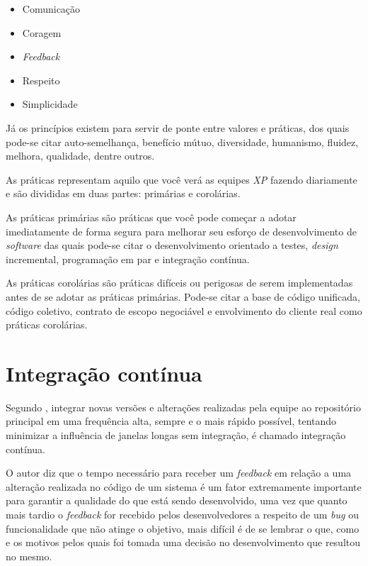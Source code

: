 \documentclass[
12pt,				%
openright,			%
oneside,			%
a4paper,			%
english,			%
french,				%
spanish,			%
brazil,				%
]{abntex2}
\begin{document}
\begin{itemize}
	\item Comunicação
	\item Coragem
	\item \textit{Feedback}
	\item Respeito
	\item Simplicidade
\end{itemize}

Já os princípios existem para servir de ponte entre valores e práticas, dos quais pode-se citar auto-semelhança, benefício mútuo, diversidade, humanismo, fluidez, melhora, qualidade, dentre outros.

As práticas representam aquilo que você verá as equipes \textit{XP} fazendo diariamente e são divididas em duas partes: primárias e corolárias. 

As práticas primárias são práticas que você pode começar a adotar imediatamente de forma segura para melhorar seu esforço de desenvolvimento de \textit{software} das quais pode-se citar o desenvolvimento orientado a testes, \textit{design} incremental, programação em par e integração contínua.

As práticas corolárias são práticas difíceis ou perigosas de serem implementadas antes de se adotar as práticas primárias. Pode-se citar a base de código unificada, código coletivo, contrato de escopo negociável e envolvimento do cliente real como práticas corolárias.

\section{Integração contínua}

Segundo , integrar novas versões e alterações realizadas pela equipe ao repositório principal em uma frequência alta, sempre e o mais rápido possível, tentando minimizar a influência de janelas longas sem integração, é chamado integração contínua. 

O autor diz que o tempo necessário para receber um \textit{feedback} em relação a uma alteração realizada no código de um sistema é um fator extremamente importante para garantir a qualidade do que está sendo desenvolvido, uma vez que quanto mais tardio o \textit{feedback} for recebido pelos desenvolvedores a respeito de um \textit{bug} ou funcionalidade que não atinge o objetivo, mais difícil é de se lembrar o que, como e os motivos pelos quais foi tomada uma decisão no desenvolvimento que resultou no mesmo.
\end{document}
